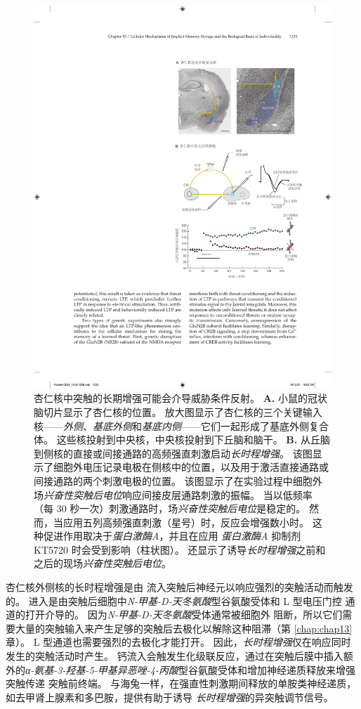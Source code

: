 \begin{figure}[htbp]
	\centering
	\includegraphics[width=0.7\linewidth]{chap53/fig_53_15}
	\caption{杏仁核中突触的长期增强可能会介导威胁条件反射。
		\textbf{A.} 小鼠的冠状脑切片显示了杏仁核的位置。
		放大图显示了杏仁核的三个关键输入核——\textit{外侧}、\textit{基底外侧}和\textit{基底内侧}——它们一起形成了基底外侧复合体。
		这些核投射到中央核，中央核投射到下丘脑和脑干\cite{maren1999long}。
		\textbf{B.} 从丘脑到侧核的直接或间接通路的高频强直刺激启动\textit{长时程增强}。
		该图显示了细胞外电压记录电极在侧核中的位置，以及用于激活直接通路或间接通路的两个刺激电极的位置。
		该图显示了在实验过程中细胞外场\textit{兴奋性突触后电位}响应间接皮层通路刺激的振幅。
		当以低频率（每 30 秒一次）刺激通路时，场\textit{兴奋性突触后电位}是稳定的。
		然而，当应用五列高频强直刺激（星号）时，反应会增强数小时。
		这种促进作用取决于\textit{蛋白激酶A}，并且在应用 \textit{蛋白激酶A} 抑制剂 KT5720 时会受到影响（柱状图）。 还显示了诱导\textit{长时程增强}之前和之后的现场\textit{兴奋性突触后电位}\cite{huang1998postsynaptic,huang2000both}。}
	\label{fig:53_15}
\end{figure}


杏仁核外侧核的长时程增强是由  流入突触后神经元以响应强烈的突触活动而触发的。
 进入是由突触后细胞中\textit{N-甲基-D-天冬氨酸}型谷氨酸受体和 L 型电压门控  通道的打开介导的。
因为\textit{N-甲基-D-天冬氨酸}受体通常被细胞外  阻断，所以它们需要大量的突触输入来产生足够的突触后去极化以解除这种阻滞（第 \ref{chap:chap13} 章）。
L 型通道也需要强烈的去极化才能打开。 因此，\textit{长时程增强}仅在响应同时发生的突触活动时产生。
钙流入会触发生化级联反应，通过在突触后膜中插入额外的\textit{α-氨基-3-羟基-5-甲基异恶唑-4-丙酸}型谷氨酸受体和增加神经递质释放来增强突触传递 突触前终端。
与海兔一样，在强直性刺激期间释放的单胺类神经递质，如去甲肾上腺素和多巴胺，提供有助于诱导 \textit{长时程增强}的异突触调节信号。


